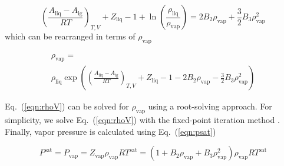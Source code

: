 \documentclass[5p,times]{elsarticle}
\begin{document}
\begin{equation}
\left( \frac{ A_\mathrm{liq} - A_\mathrm{ig} }{{RT}} \right)_{T,V} + {Z_{\mathrm{liq}}} - 1 + \ln \left( \frac{{{\rho _{\mathrm{liq}}}}}{{{\rho _{\mathrm{vap}}}}} \right) = 2{B_2} {\rho _{\mathrm{vap}}} + \frac{3}{2}{B_3} \rho _{\mathrm{vap}}^2 \label{eqn:eqn14}
\end{equation}
which can be rearranged in terms of ${\rho_\mathrm{vap}}$ 

\begin{equation}
\begin{array}{l}
{\rho _{\mathrm{vap}} = }
\\ 
{{\rho _{\mathrm{liq}}}\exp \left( {{{\left( {\frac{{{A_\mathrm{liq}} - {A_\mathrm{ig}}}}{{RT}}} \right)}_{T,V}} + {Z_{\mathrm{liq}}} - 1 - 2{B_2} {\rho _{\mathrm{vap}}} - \frac{3}{2}{B_3} \rho _{\mathrm{vap}}^2}
\right) }  
\end{array}
\label{eqn:rhoV}
\end{equation}

Eq.~(\ref{eqn:rhoV}) can be solved for $\rho_\mathrm{vap}$ using a root-solving approach. For simplicity, we solve Eq.~(\ref{eqn:rhoV}) with the fixed-point iteration method \cite{Burden1985}. Finally, vapor pressure is calculated using Eq.~(\ref{eqn:psat})

\begin{equation}
P^\mathrm{sat} = P_\mathrm{vap} = {Z_\mathrm{vap}}{\rho _\mathrm{vap}}RT^\mathrm{sat} = (1 + {B_2} {\rho_\mathrm{vap}} + {B_3}\rho _\mathrm{vap}^2){\rho _\mathrm{vap}}RT^\mathrm{sat} 
\label{eqn:psat}
\end{equation}
\end{document}
